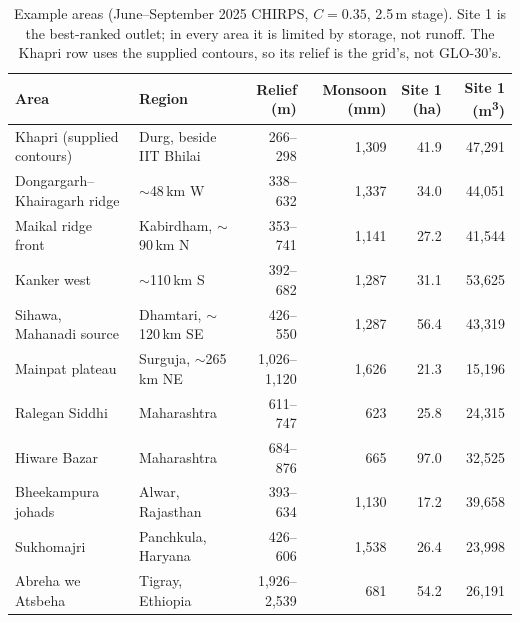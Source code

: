 \documentclass[11pt,a4paper]{article}
\newcommand{\mthree}{m\textsuperscript{3}}
\begin{document}
\begin{table}[htbp]
\centering\small
\begin{tabularx}{\linewidth}{@{}L{44mm}Yrrrr@{}}
\toprule
\textbf{Area} & \textbf{Region} & \textbf{Relief (m)} & \textbf{Monsoon (mm)} & \textbf{Site 1 (ha)} & \textbf{Site 1 (\mthree)}\\
\midrule
Khapri (supplied contours) & Durg, beside IIT Bhilai & 266--298 & 1,309 & 41.9 & 47,291\\
Dongargarh--Khairagarh ridge & $\sim$48\,km W & 338--632 & 1,337 & 34.0 & 44,051\\
Maikal ridge front & Kabirdham, $\sim$90\,km N & 353--741 & 1,141 & 27.2 & 41,544\\
Kanker west & $\sim$110\,km S & 392--682 & 1,287 & 31.1 & 53,625\\
Sihawa, Mahanadi source & Dhamtari, $\sim$120\,km SE & 426--550 & 1,287 & 56.4 & 43,319\\
Mainpat plateau & Surguja, $\sim$265\,km NE & 1,026--1,120 & 1,626 & 21.3 & 15,196\\
Ralegan Siddhi & Maharashtra & 611--747 & 623 & 25.8 & 24,315\\
Hiware Bazar & Maharashtra & 684--876 & 665 & 97.0 & 32,525\\
Bheekampura johads & Alwar, Rajasthan & 393--634 & 1,130 & 17.2 & 39,658\\
Sukhomajri & Panchkula, Haryana & 426--606 & 1,538 & 26.4 & 23,998\\
Abreha we Atsbeha & Tigray, Ethiopia & 1,926--2,539 & 681 & 54.2 & 26,191\\
\bottomrule
\end{tabularx}
\caption{Example areas (June--September 2025 CHIRPS, $C=0.35$, 2.5\,m stage). Site 1 is the best-ranked outlet; in every area it is limited by storage, not runoff. The Khapri row uses the supplied contours, so its relief is the grid's, not GLO-30's.}
\label{tab:examples}
\end{table}
\end{document}
